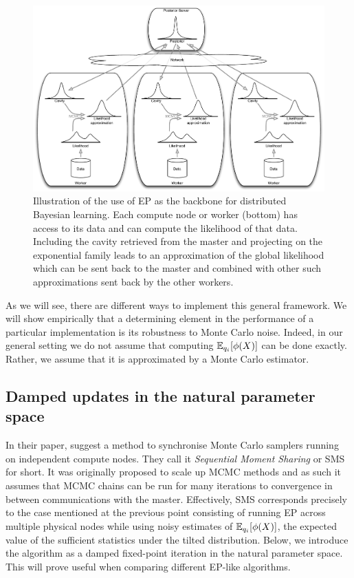 \begin{figure}[!h]
	\center
	\includegraphics[width=\textwidth]{figures/snep/PosteriorServer}
	\caption{\label{fig:SNEP-arch} Illustration of the use of EP as the backbone for distributed Bayesian learning. Each compute node or worker (bottom) has access to its data and can compute the likelihood of that data. Including the cavity retrieved from the master and projecting on the exponential family leads to an approximation of the global likelihood which can be sent back to the master and combined with other such approximations sent back by the other workers.}
\end{figure}

As we will see, there are different ways to implement this general framework.
We will show empirically that a determining element in the performance of a particular implementation is its robustness to Monte Carlo noise. 
Indeed, in our general setting we do not assume that computing $\mathbb E_{q_i}[\phi(X)]$ can be done exactly. Rather, we assume that it is approximated by a Monte Carlo estimator.

\subsection{Damped updates in the natural parameter space}
In their paper, \citet{xu14} suggest a method to synchronise Monte Carlo samplers running on independent compute nodes. 
They call it \emph{Sequential Moment Sharing} or SMS for short. 
It was originally proposed to scale up MCMC methods and as such it assumes that MCMC chains can be run for many iterations to convergence in between communications with the master. Effectively, SMS corresponds precisely to the case mentioned at the previous point consisting of running EP across multiple physical nodes while using noisy estimates of $\mathbb E_{q_i}[\phi(X)]$, the expected value of the sufficient statistics under the tilted distribution. 
Below, we introduce the algorithm as a damped fixed-point iteration in the natural parameter space. This will prove useful when comparing different EP-like algorithms.

